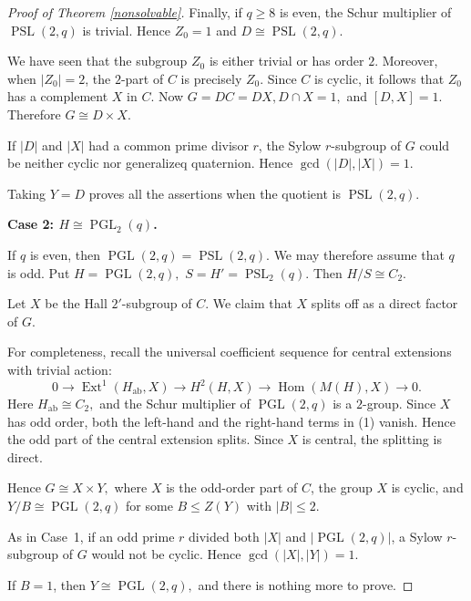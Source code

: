 \documentclass[preprint,11pt]{elsarticle}
\begin{document}
\begin{proof}[Proof of Theorem \ref{nonsolvable}]
	

	
	Finally, if $q\geq8$ is even, the Schur multiplier of
	$\operatorname{PSL}(2,q)$ is trivial.  Hence
$
	Z_0=1$
and 
$D\cong\operatorname{PSL}(2,q).
$

We have seen that the subgroup $Z_0$ is either trivial or has order $2$.
	Moreover, when $|Z_0|=2$, the $2$-part of $C$ is precisely
	$Z_0$.  Since $C$ is cyclic, it follows that $Z_0$ has a
	complement $X$ in $C$.
	Now
$
	G=DC=DX, 
	D\cap X=1,
$ and
	$[D,X]=1.
$
	Therefore
	$G\cong D\times X.
$
	

If $|D|$ and $|X|$ had a common prime divisor $r$, the Sylow $r$-subgroup of $G$ could be neither cyclic nor generalizeq quaternion. 	Hence $
\gcd(|D|,|X|)=1.
$


	Taking $Y=D$ proves all the assertions when the quotient
	is $\operatorname{PSL}(2,q)$.
	
	\medskip
	\noindent
	\textbf{Case 2: $H\cong\operatorname{PGL}_2(q)$.}
	
	If $q$ is even, then $
	\operatorname{PGL}(2,q)
	=\operatorname{PSL}(2,q)
$.  We may therefore
	assume that $q$ is odd.  Put
$H=\operatorname{PGL}(2,q),$
$S=H'=\operatorname{PSL}_2(q).
$
	Then
$
	H/S \cong C_2.
$
	
	Let $X$ be the Hall $2'$-subgroup of $C$.  We claim that $X$
	splits off as a direct factor of $G$.
	
	For completeness, recall the universal coefficient sequence
	for central extensions with trivial action:
	\[
	0\longrightarrow
	\operatorname{Ext}^{1}(H_{\mathrm{ab}},X)
	\longrightarrow
	H^2(H,X)
	\longrightarrow
	\operatorname{Hom}(M(H),X)
	\longrightarrow0.
	\tag{1}
	\]
	Here
$H_{\mathrm{ab}}\cong C_2,
$
	and the Schur multiplier of $\operatorname{PGL}(2,q)$ is a
	$2$-group.  Since $X$ has odd order, both the left-hand and the
	right-hand terms in (1) vanish.  Hence the odd part of the
	central extension splits.  Since $X$ is central, the splitting
	is direct.
	
Hence
$
	G\cong X\times Y,
$
	where $X$ is the odd-order part of $C$, the group $X$ is cyclic,
	and $
	Y/B\cong\operatorname{PGL}(2,q)
$
	for some
$	B\leq Z(Y)$ with $|B|\leq 2.$

	
As in Case~1, if an odd prime $r$ divided both $|X|$ and
$|\operatorname{PGL}(2,q)|$, a Sylow $r$-subgroup of $G$ would not be cyclic.
Hence $\gcd(|X|,|Y|)=1.$


	
	If $B=1$, then
$
	Y\cong\operatorname{PGL}(2,q),
$
	and there is nothing more to prove.
	

\end{proof}
\end{document}
